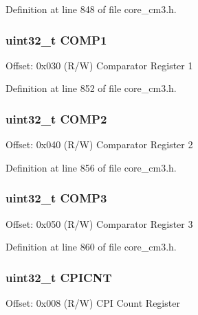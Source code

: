 Definition at line 848 of file core\+\_\+cm3.\+h.

\subsubsection[{\texorpdfstring{C\+O\+M\+P1}{COMP1}}]{ uint32\+\_\+t C\+O\+M\+P1}\hypertarget{struct_d_w_t___type_af9126caaf63b99d6df5d1e040c96e2ab}{}\label{struct_d_w_t___type_af9126caaf63b99d6df5d1e040c96e2ab}
Offset\+: 0x030 (R/W) Comparator Register 1 

Definition at line 852 of file core\+\_\+cm3.\+h.

\subsubsection[{\texorpdfstring{C\+O\+M\+P2}{COMP2}}]{ uint32\+\_\+t C\+O\+M\+P2}\hypertarget{struct_d_w_t___type_aeeb1e36001c60a167399683280d6ec39}{}\label{struct_d_w_t___type_aeeb1e36001c60a167399683280d6ec39}
Offset\+: 0x040 (R/W) Comparator Register 2 

Definition at line 856 of file core\+\_\+cm3.\+h.

\subsubsection[{\texorpdfstring{C\+O\+M\+P3}{COMP3}}]{ uint32\+\_\+t C\+O\+M\+P3}\hypertarget{struct_d_w_t___type_a20b0b62a3576ee88db4a7c065cd988ac}{}\label{struct_d_w_t___type_a20b0b62a3576ee88db4a7c065cd988ac}
Offset\+: 0x050 (R/W) Comparator Register 3 

Definition at line 860 of file core\+\_\+cm3.\+h.

\subsubsection[{\texorpdfstring{C\+P\+I\+C\+NT}{CPICNT}}]{ uint32\+\_\+t C\+P\+I\+C\+NT}\hypertarget{struct_d_w_t___type_a29ca657c77928334be08a2e6555be950}{}\label{struct_d_w_t___type_a29ca657c77928334be08a2e6555be950}
Offset\+: 0x008 (R/W) C\+PI Count Register 

